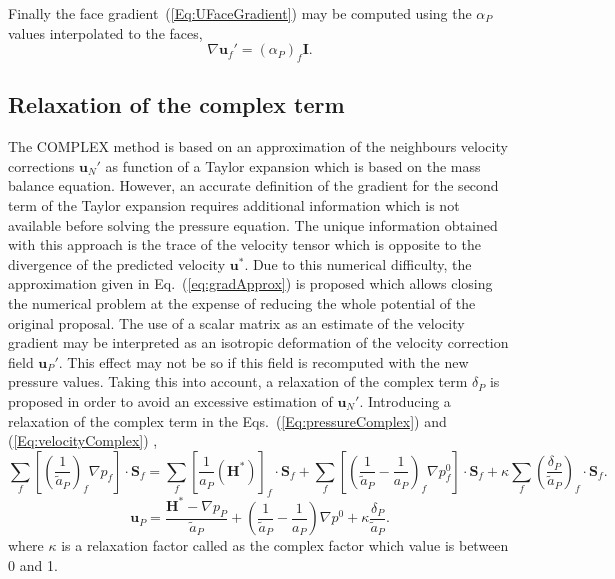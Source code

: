 \documentclass[final,3p,times,11pt,onecolumn]{myElsarticle}
\numberwithin{equation}{section}
\begin{document}
Finally the face gradient~(\ref{Eq:UFaceGradient}) may be computed using the $\alpha_P$ values interpolated to the faces,
\begin{equation}
\nabla \boldsymbol{u}_f'
=
\left(
\alpha_P
\right)_f
\boldsymbol{I}.
\end{equation}

\subsection{Relaxation of the complex term}
The COMPLEX method is based on an approximation of the neighbours velocity corrections $\boldsymbol{u}_N'$ as function of a Taylor expansion which is based on the mass balance equation. However, an accurate definition of the gradient for the second term of the Taylor expansion requires additional information which is not available before solving the pressure equation. The unique information obtained with this approach is the trace of the velocity tensor which is opposite to the divergence of the predicted velocity $\boldsymbol{u}^*$. Due to this numerical difficulty, the approximation given in Eq.~(\ref{eq:gradApprox}) is proposed which allows closing the numerical problem at the expense of reducing the whole potential of the original proposal. The use of a scalar matrix as an estimate of the velocity gradient may be interpreted as an isotropic deformation of the velocity correction field $\boldsymbol{u}_P'$. This effect may not be so if this field is recomputed with the new pressure values. Taking this into account, a relaxation of the complex term $\delta_P$ is proposed in order to avoid an excessive estimation of $\boldsymbol{u}_N'$. Introducing a relaxation of the complex term in the Eqs.~(\ref{Eq:pressureComplex}) and (\ref{Eq:velocityComplex}) , 
\begin{equation}
\label{Eq:pressureComplexRelaxed}
\sum_f
\left[
\left(
\dfrac
{1}
{\tilde{a}_P}
\right)_f
\nabla p_f
\right]
\cdot 
\boldsymbol{S}_f
= 
\sum_f 
\left[
\frac{1}{a_P}
\left(
\boldsymbol{H}^*
\right)
\right]_f 
\cdot
\boldsymbol{S}_f
+
\sum_f
\left[
\left(
\dfrac
{1}
{\tilde{a}_P}
-
\dfrac
{1}
{a_P}
\right)_f
\nabla p^{0}_f
\right]
\cdot
\boldsymbol{S}_f
+
\kappa
\sum_f
\left(
\dfrac{\delta_P}{\tilde{a}_P}
\right)_f
\cdot
\boldsymbol{S}_f.
\end{equation}
\begin{equation}
\label{Eq:velocityComplexRelaxed}
\boldsymbol{u}_P 
=
\dfrac
{
\boldsymbol{H}^*
- 
\nabla p_P}
{\tilde{a}_P}
+
\left(
\dfrac{1}
{\tilde{a}_P}
-
\dfrac{1}
{a_P}
\right)
\nabla p^{0}
+
\kappa
\dfrac{\delta_P}
{\tilde{a}_P}.
\end{equation}
where $\kappa$ is a relaxation factor called as the complex factor which value is between 0 and 1.
\end{document}
